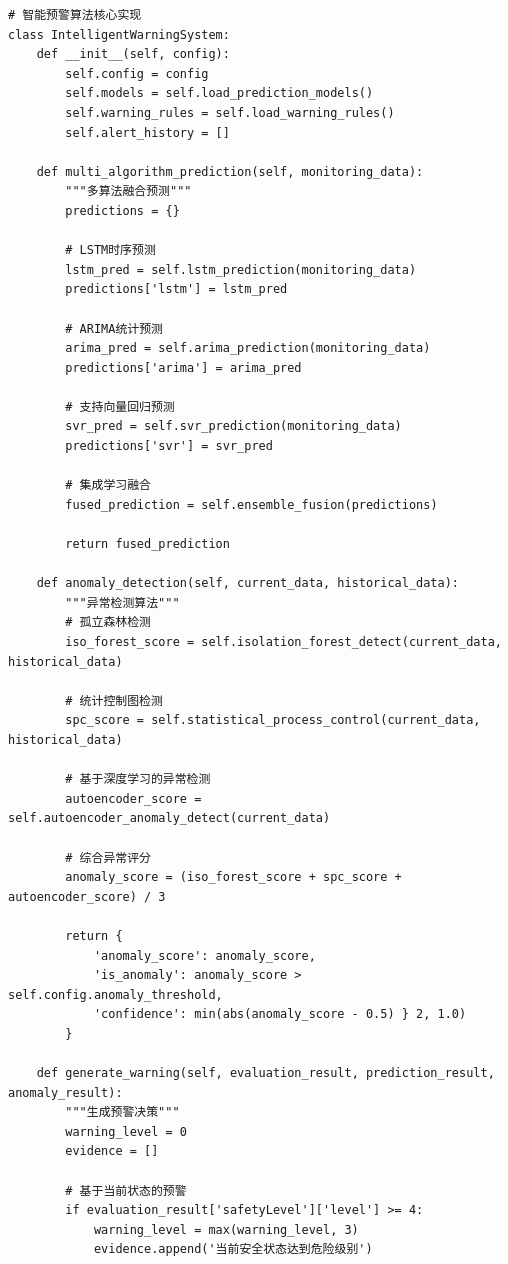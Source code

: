 \begin{lstlisting}[style=python]
# 智能预警算法核心实现
class IntelligentWarningSystem:
    def __init__(self, config):
        self.config = config
        self.models = self.load_prediction_models()
        self.warning_rules = self.load_warning_rules()
        self.alert_history = []
        
    def multi_algorithm_prediction(self, monitoring_data):
        """多算法融合预测"""
        predictions = {}
        
        # LSTM时序预测
        lstm_pred = self.lstm_prediction(monitoring_data)
        predictions['lstm'] = lstm_pred
        
        # ARIMA统计预测
        arima_pred = self.arima_prediction(monitoring_data)
        predictions['arima'] = arima_pred
        
        # 支持向量回归预测
        svr_pred = self.svr_prediction(monitoring_data)
        predictions['svr'] = svr_pred
        
        # 集成学习融合
        fused_prediction = self.ensemble_fusion(predictions)
        
        return fused_prediction
    
    def anomaly_detection(self, current_data, historical_data):
        """异常检测算法"""
        # 孤立森林检测
        iso_forest_score = self.isolation_forest_detect(current_data, historical_data)
        
        # 统计控制图检测  
        spc_score = self.statistical_process_control(current_data, historical_data)
        
        # 基于深度学习的异常检测
        autoencoder_score = self.autoencoder_anomaly_detect(current_data)
        
        # 综合异常评分
        anomaly_score = (iso_forest_score + spc_score + autoencoder_score) / 3
        
        return {
            'anomaly_score': anomaly_score,
            'is_anomaly': anomaly_score > self.config.anomaly_threshold,
            'confidence': min(abs(anomaly_score - 0.5) } 2, 1.0)
        }
    
    def generate_warning(self, evaluation_result, prediction_result, anomaly_result):
        """生成预警决策"""
        warning_level = 0
        evidence = []
        
        # 基于当前状态的预警
        if evaluation_result['safetyLevel']['level'] >= 4:
            warning_level = max(warning_level, 3)
            evidence.append('当前安全状态达到危险级别')
            

\end{lstlisting}
